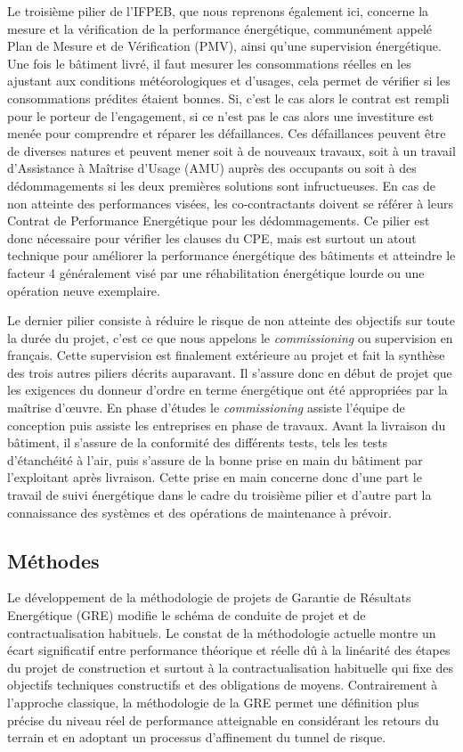 Le troisième pilier de l'IFPEB, que nous reprenons également ici, concerne la mesure et la vérification de la performance énergétique, communément appelé Plan de Mesure et de Vérification (PMV), ainsi qu'une supervision énergétique. Une fois le bâtiment livré, il faut mesurer les consommations réelles en les ajustant aux conditions météorologiques et d'usages, cela permet de vérifier si les consommations prédites étaient bonnes. Si, c'est le cas alors le contrat est rempli pour le porteur de l'engagement, si ce n'est pas le cas alors une investiture est menée pour comprendre et réparer les défaillances. Ces défaillances peuvent être de diverses natures et peuvent mener soit à de nouveaux travaux, soit à un travail d'Assistance à Maîtrise d'Usage (AMU) auprès des occupants ou soit à des dédommagements si les deux premières solutions sont infructueuses. En cas de non atteinte des performances visées, les co-contractants doivent se référer à leurs Contrat de Performance Energétique pour les dédommagements. Ce pilier est donc nécessaire pour vérifier les clauses du CPE, mais est surtout un atout technique pour améliorer la performance énergétique des bâtiments et atteindre le facteur 4 généralement visé par une réhabilitation énergétique lourde ou une opération neuve exemplaire.

Le dernier pilier consiste à réduire le risque de non atteinte des objectifs sur toute la durée du projet, c'est ce que nous appelons le \textit{commissioning} ou supervision en français. Cette supervision est finalement extérieure au projet et fait la synthèse des trois autres piliers décrits auparavant. Il s'assure donc en début de projet que les exigences du donneur d'ordre en terme énergétique ont été appropriées par la maîtrise d'œuvre. En phase d'études le \textit{commissioning} assiste l'équipe de conception puis assiste les entreprises en phase de travaux. Avant la livraison du bâtiment, il s'assure de la conformité des différents tests, tels les tests d'étanchéité à l'air, puis s'assure de la bonne prise en main du bâtiment par l'exploitant après livraison. Cette prise en main concerne donc d'une part le travail de suivi énergétique dans le cadre du troisième pilier et d'autre part la connaissance des systèmes et des opérations de maintenance à prévoir. 

\subsection{Méthodes}

Le développement de la méthodologie de projets de Garantie de Résultats Energétique (GRE) modifie le schéma de conduite de projet et de contractualisation habituels. Le constat de la méthodologie actuelle montre un écart significatif entre performance théorique et réelle dû à la linéarité des étapes du projet de construction et surtout à la contractualisation habituelle qui fixe des objectifs techniques constructifs et des obligations de moyens. Contrairement à l'approche classique, la méthodologie de la GRE permet une définition plus précise du niveau réel de performance atteignable en considérant les retours du terrain et en adoptant un processus d'affinement du tunnel de risque.

